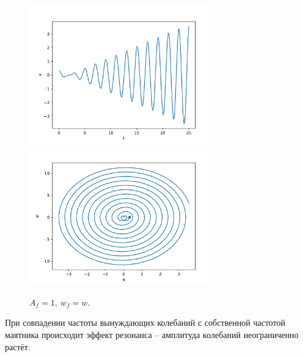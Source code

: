             \begin{figure}[H]
                \centering
                \includegraphics[width=8cm]{pictures/4resonance3.pdf}
                \includegraphics[width=8cm]{pictures/4resonance3p.pdf}
                \caption{$A_f = 1, ~ w_f = w$.}
            \end{figure}
            При совпадении частоты вынуждающих колебаний с собственной частотой маятника происходит эффект резонанса -- амплитуда колебаний неограниченно растёт.

